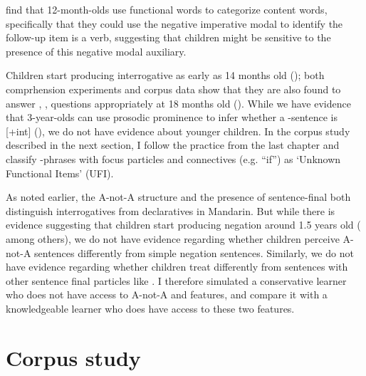   \cite{zhang2015bie} find that 12-month-olds use functional words to categorize content words, specifically that they could use the negative imperative modal  to identify the follow-up item is a verb, suggesting that children might be sensitive to the presence of this negative modal auxiliary.  %


 Children start producing interrogative \twh{} as early as 14 months old (\cite{lee1989acq, fan2012, linjing2014}); both comprhension experiments and corpus data show that they are also found to answer , ,  questions appropriately at 18 months old (\citealt{fan2012,moradlou2020}). While we have evidence that 3-year-olds can use prosodic prominence to infer whether a \twh-sentence is [+int] (\cite{WHanything}), we do not have evidence about younger children. In the corpus study described in the next section, I follow the practice from the last chapter and classify \twh-phrases with focus particles and connectives (e.g.  ``if'') as `Unknown Functional Items' (UFI).

 As noted earlier, the A-not-A structure and the presence of sentence-final  both distinguish interrogatives from declaratives in Mandarin. But while there is evidence suggesting that children start producing negation around 1.5 years old (\cite{lee1982neg,fan2007,li2019neg, huang2022manchild} among others), we do not have evidence regarding whether children perceive A-not-A sentences differently from simple negation sentences. Similarly, we do not have evidence regarding whether children treat  differently from sentences with other sentence final particles like . I therefore simulated a conservative learner who does not have access to A-not-A and  features, and compare it with a knowledgeable learner who does have access to these two features. 





\section{Corpus study}
\label{sec:mancl:corpus}

